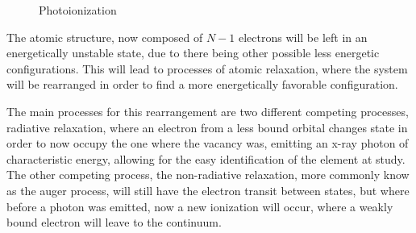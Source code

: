 \begin{figure}[h!]
    \centering
    \caption{Photoionization}
\end{figure}

The atomic structure, now composed of $N-1$ electrons will be left in an energetically unstable state, due to there being other possible less energetic configurations. This will lead to processes of atomic relaxation, where the system will be rearranged in order to find a more energetically favorable configuration.

The main processes for this rearrangement are two different competing processes, radiative relaxation, where an electron from a less bound orbital changes state in order to now occupy the one where the vacancy was, emitting an x-ray photon of characteristic energy, allowing for the easy identification of the element at study.
The other competing process, the non-radiative relaxation, more commonly know as the auger process, will still have the electron transit between states, but where before a photon was emitted, now a new ionization will occur, where a weakly bound electron will leave to the continuum.



